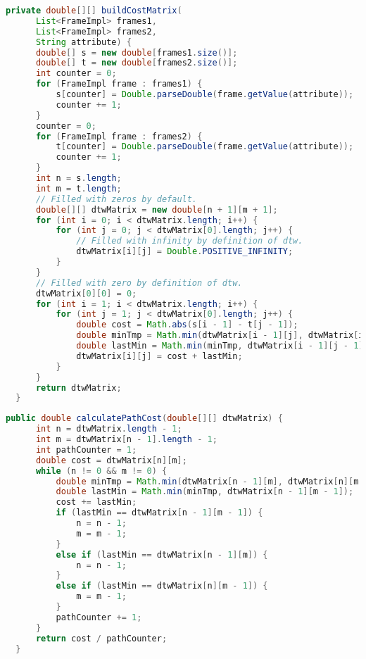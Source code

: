 \begin{lstfloat}
\begin{lstlisting}[language=Java, label={lst:DtwMatrix}, caption=DTW: Kostenmatrix.]
  private double[][] buildCostMatrix(
      List<FrameImpl> frames1,
      List<FrameImpl> frames2,
      String attribute) {
      double[] s = new double[frames1.size()];
      double[] t = new double[frames2.size()];
      int counter = 0;
      for (FrameImpl frame : frames1) {
          s[counter] = Double.parseDouble(frame.getValue(attribute));
          counter += 1;
      }
      counter = 0;
      for (FrameImpl frame : frames2) {
          t[counter] = Double.parseDouble(frame.getValue(attribute));
          counter += 1;
      }
      int n = s.length;
      int m = t.length;
      // Filled with zeros by default.
      double[][] dtwMatrix = new double[n + 1][m + 1];
      for (int i = 0; i < dtwMatrix.length; i++) {
          for (int j = 0; j < dtwMatrix[0].length; j++) {
              // Filled with infinity by definition of dtw.
              dtwMatrix[i][j] = Double.POSITIVE_INFINITY;
          }
      }
      // Filled with zero by definition of dtw.
      dtwMatrix[0][0] = 0;
      for (int i = 1; i < dtwMatrix.length; i++) {
          for (int j = 1; j < dtwMatrix[0].length; j++) {
              double cost = Math.abs(s[i - 1] - t[j - 1]);
              double minTmp = Math.min(dtwMatrix[i - 1][j], dtwMatrix[i][j - 1]);
              double lastMin = Math.min(minTmp, dtwMatrix[i - 1][j - 1]);
              dtwMatrix[i][j] = cost + lastMin;
          }
      }
      return dtwMatrix;
  }
\end{lstlisting}
\end{lstfloat}
\begin{lstfloat}
\begin{lstlisting}[language=Java, label={lst:DtwPath}, caption=DTW: Warping Path berechnen.]
  public double calculatePathCost(double[][] dtwMatrix) {
      int n = dtwMatrix.length - 1;
      int m = dtwMatrix[n - 1].length - 1;
      int pathCounter = 1;
      double cost = dtwMatrix[n][m];
      while (n != 0 && m != 0) {
          double minTmp = Math.min(dtwMatrix[n - 1][m], dtwMatrix[n][m - 1]);
          double lastMin = Math.min(minTmp, dtwMatrix[n - 1][m - 1]);
          cost += lastMin;
          if (lastMin == dtwMatrix[n - 1][m - 1]) {
              n = n - 1;
              m = m - 1;
          }
          else if (lastMin == dtwMatrix[n - 1][m]) {
              n = n - 1;
          }
          else if (lastMin == dtwMatrix[n][m - 1]) {
              m = m - 1;
          }
          pathCounter += 1;
      }
      return cost / pathCounter;
  }
\end{lstlisting}
\end{lstfloat}

